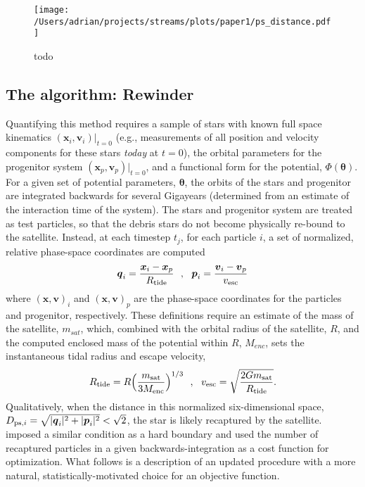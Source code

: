 \documentclass[preprint]{aastex}
\newcommand{\bs}{\boldsymbol}
\begin{document}
\begin{figure}[h]
\begin{center}
\texttt{[image: /Users/adrian/projects/streams/plots/paper1/ps\_distance.pdf]}
\caption{ todo }\label{fig:ps_distance}
\end{center}
\end{figure}

\subsection{The algorithm: Rewinder}
Quantifying this method requires a sample of stars with known full
space kinematics $(\bs{x}_{i}, \bs{v}_{i})|_{t=0}$ (e.g., measurements
of all position and velocity components for these stars \emph{today}
at $t=0$), the orbital parameters for the progenitor system
$(\bs{x}_p, \bs{v}_p)|_{t=0}$, and a functional form for the
potential, $\Phi({\boldsymbol\theta})$. For a given set of potential
parameters, $\boldsymbol\theta$, the orbits of the stars and
progenitor are integrated backwards for several Gigayears (determined
from an estimate of the interaction time of the system). The stars and
progenitor system are treated as test particles, so that the debris
stars do not become physically re-bound to the satellite. Instead, at
each timestep $t_j$, for each particle $i$, a set of normalized,
relative phase-space coordinates are computed
\begin{equation}
  \bs{q}_{i} = \frac{\bs{x}_{i} -
    \bs{x}_{p}}{R_{\rm tide}}\,\,\,\,,\,\,\,\,\bs{p}_{i} = \frac{\bs{v}_{i} -
    \bs{v}_{p}}{v_{\rm esc}}
\end{equation}
where $(\bs{x},\bs{v})_{i}$ and $(\bs{x},\bs{v})_{p}$ are the
phase-space coordinates for the particles and progenitor,
respectively. These definitions require an estimate of the mass of the
satellite, $m_{sat}$, which, combined with the orbital radius of the
satellite, $R$, and the computed enclosed mass of the potential within
$R$, $M_{enc}$, sets the instantaneous tidal radius and escape
velocity,
\begin{equation}
  R_{\rm tide}=R\Big(\frac{m_{\rm sat}}{3M_{\rm enc}}\Big)^{1/3}\,\,\,\,,\,\,\,\,
  v_{\rm esc}=\sqrt{\frac{2Gm_{\rm sat}}{R_{\rm tide}}}.
\end{equation}
Qualitatively, when the distance in this normalized six-dimensional
space, $D_{{\rm ps},i}=\sqrt{|\bs{q}_{i}|^2+|\bs{p}_{i}|^2} <
\sqrt{2}$, the star is likely recaptured by the
satellite. \citet{johnston99a} imposed a similar
condition as a hard boundary and used the number of recaptured
particles in a given backwards-integration as a cost function for
optimization. What follows is a description of an updated procedure
with a more natural, statistically-motivated choice for an objective
function.
\end{document}
